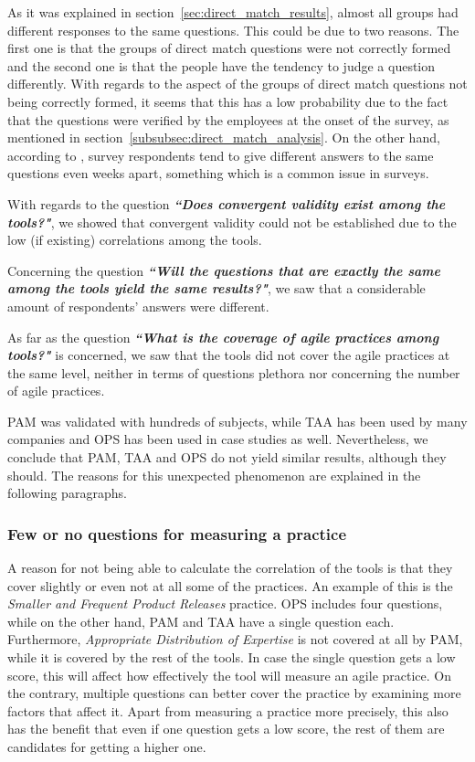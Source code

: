 As it was explained in section~\ref{sec:direct_match_results}, almost all groups had different responses to the same questions. This could be due to two reasons. The first one is that the groups of direct match questions were not correctly formed and the second one is that the people have the tendency to judge a question differently. With regards to the aspect of the groups of direct match questions not being correctly formed, it seems that this has a low probability due to the fact that the questions were verified by the employees at the onset of the survey, as mentioned in section~\ref{subsubsec:direct_match_analysis}. On the other hand, according to \citet{Lacy}, survey respondents tend to give different answers to the same questions even weeks apart, something which is a common issue in surveys.

With regards to the question \textbf{\textit{``Does convergent validity exist among the tools?"}}, we showed that convergent validity could not be established due to the low (if existing) correlations among the tools.

Concerning the question \textbf{\textit{``Will the questions that are exactly the same among the tools yield the same results?"}}, we saw that a considerable amount of respondents' answers were different.

As far as the question \textbf{\textit{``What is the coverage of agile practices among tools?"}} is concerned, we saw that the tools did not cover the agile practices at the same level, neither in terms of questions plethora nor concerning the number of agile practices.

\ac{PAM} was validated with hundreds of subjects, while \ac{TAA} has been used by many companies and \ac{OPS} has been used in case studies as well. Nevertheless, we conclude that \ac{PAM}, \ac{TAA} and \ac{OPS} do not yield similar results, although they should. The reasons for this unexpected phenomenon are explained in the following paragraphs.

\subsubsection{Few or no questions for measuring a practice}
A reason for not being able to calculate the correlation of the tools is that they cover slightly or even not at all some of the practices. An example of this is the \textit{Smaller and Frequent Product Releases} practice. \ac{OPS} includes four questions, while on the other hand, \ac{PAM} and \ac{TAA} have a single question each. Furthermore, \textit{Appropriate Distribution of Expertise} is not covered at all by \ac{PAM}, while it is covered by the rest of the tools. In case the single question gets a low score, this will affect how effectively the tool will measure an agile practice. On the contrary, multiple questions can better cover the practice by examining more factors that affect it. Apart from measuring a practice more precisely, this also has the benefit that even if one question gets a low score, the rest of them are candidates for getting a higher one.

